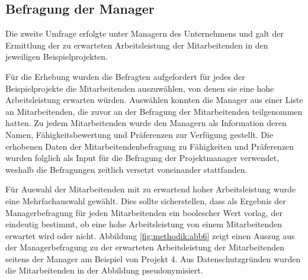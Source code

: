 
\subsection{Befragung der Manager}
\label{ch:methodik:datenerhebung:2}
Die zweite Umfrage erfolgte unter Managern des Unternehmens und galt der Ermittlung der zu erwarteten Arbeitsleistung der Mitarbeitenden in den jeweiligen Beispielprojekten.

Für die Erhebung wurden die Befragten aufgefordert für jedes der Beispielprojekte die Mitarbeitenden auszuwählen, von denen sie eine hohe Arbeitsleistung erwarten würden.
Auswählen konnten die Manager aus einer Liste an Mitarbeitenden, die zuvor an der Befragung der Mitarbeitenden teilgenommen hatten.
Zu jedem Mitarbeitenden wurde den Managern als Information deren Namen, Fähigkeitsbewertung und Präferenzen zur Verfügung gestellt.
Die erhobenen Daten der Mitarbeitendenbefragung zu Fähigkeiten und Präferenzen wurden folglich als Input für die Befragung der Projektmanager verwendet, weshalb die Befragungen zeitlich versetzt voneinander stattfanden.

Für Auswahl der Mitarbeitenden mit zu erwartend hoher Arbeitsleistung wurde eine Mehrfachauswahl gewählt.
Dies sollte sicherstellen, dass als Ergebnis der Managerbefragung für jeden Mitarbeitenden ein boolescher Wert vorlag, der eindeutig bestimmt, ob eine hohe Arbeitsleistung von einem Mitarbeitenden erwartet wird oder nicht.
Abbildung \ref{fig:methodik:abb6} zeigt einen Auszug aus der Managerbefragung zu der erwarteten Arbeitsleistung der Mitarbeitenden seitens der Manager am Beispiel von Projekt 4.
Aus Datenschutzgründen wurden die Mitarbeitenden in der Abbildung pseudonymisiert.

